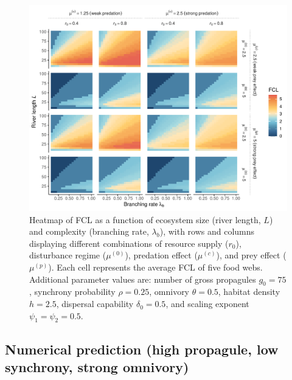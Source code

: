 \begin{figure}
\centering
\includegraphics{../data_fmt/fig_rho025_g75_theta05.pdf}
\caption{Heatmap of FCL as a function of ecosystem size (river length,
\(L\)) and complexity (branching rate, \(\lambda_b\)), with rows and
columns displaying different combinations of resource supply (\(r_0\)),
disturbance regime (\(\mu^{(0)}\)), predation effect (\(\mu^{(c)}\)),
and prey effect (\(\mu^{(p)}\)). Each cell represents the average FCL of
five food webs. Additional parameter values are: number of gross
propagules \(g_0=75\), synchrony probability \(\rho=0.25\), omnivory
\(\theta=0.5\), habitat density \(h=2.5\), dispersal capability
\(\delta_0=0.5\), and scaling exponent \(\psi_1=\psi_2=0.5\).}
\end{figure}

\newpage

\subsection{Numerical prediction (high propagule, low synchrony, strong
omnivory)}\label{numerical-prediction-high-propagule-low-synchrony-strong-omnivory}

